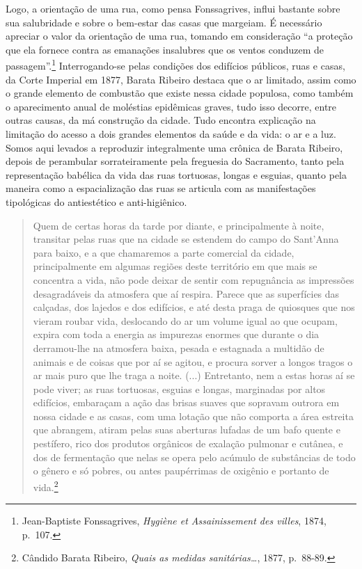 Logo, a orientação de uma rua, como pensa Fonssagrives, influi bastante
sobre sua salubridade e sobre o bem-estar das casas que margeiam. É
necessário apreciar o valor da orientação de uma rua, tomando em
consideração ``a proteção que ela fornece contra as emanações insalubres
que os ventos conduzem de passagem''.\footnote{Jean-Baptiste
  Fonssagrives, \emph{Hygiène et Assainissement des villes}, 1874,
  p.~107.} Interrogando-se pelas condições dos edifícios públicos, ruas
e casas, da Corte Imperial em 1877, Barata Ribeiro destaca que o ar
limitado, assim como o grande elemento de combustão que existe nessa
cidade populosa, como também o aparecimento anual de moléstias
epidêmicas graves, tudo isso decorre, entre outras causas, da má
construção da cidade. Tudo encontra explicação na limitação do acesso a
dois grandes elementos da saúde e da vida: o ar e a luz. Somos aqui
levados a reproduzir integralmente uma crônica de Barata Ribeiro, depois
de perambular sorrateiramente pela freguesia do Sacramento, tanto pela
representação babélica da vida das ruas tortuosas, longas e esguias,
quanto pela maneira como a espacialização das ruas se articula com as
manifestações tipológicas do antiestético e anti-higiênico.

\begin{quote}
Quem de certas horas da tarde por diante, e principalmente à noite,
transitar pelas ruas que na cidade se estendem do campo do Sant'Anna
para baixo, e a que chamaremos a parte comercial da cidade,
principalmente em algumas regiões deste território em que mais se
concentra a vida, não pode deixar de sentir com repugnância as
impressões desagradáveis da atmosfera que aí respira. Parece que as
superfícies das calçadas, dos lajedos e dos edifícios, e até desta praga
de quiosques que nos vieram roubar vida, deslocando do ar um volume
igual ao que ocupam, expira com toda a energia as impurezas enormes que
durante o dia derramou-lhe na atmosfera baixa, pesada e estagnada a
multidão de animais e de coisas que por aí se agitou, e procura sorver a
longos tragos o ar mais puro que lhe traga a noite. (...) Entretanto,
nem a estas horas aí se pode viver; as ruas tortuosas, esguias e longas,
marginadas por altos edifícios, embaraçam a ação das brisas suaves que
sopravam outrora em nossa cidade e as casas, com uma lotação que não
comporta a área estreita que abrangem, atiram pelas suas aberturas
lufadas de um bafo quente e pestífero, rico dos produtos orgânicos de
exalação pulmonar e cutânea, e dos de fermentação que nelas se opera
pelo acúmulo de substâncias de todo o gênero e só pobres, ou antes
paupérrimas de oxigênio e portanto de vida.\footnote{Cândido Barata
  Ribeiro, \emph{Quais as medidas sanitárias\ldots{}}, 1877, p.~88-89.}
\end{quote}

